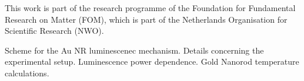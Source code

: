 \documentclass[journal=nalefd,manuscript=letter]{achemso}
\begin{document}
\begin{acknowledgement}
This work is part of the research programme of the Foundation for Fundamental
Research on Matter (FOM), which is part of the Netherlands Organisation for
Scientific Research (NWO).
\end{acknowledgement}

\begin{suppinfo}
Scheme for the Au NR luminescenec mechanism.  Details concerning the experimental setup. 
Luminescence power dependence. Gold Nanorod temperature calculations.
\end{suppinfo}



\end{document}
